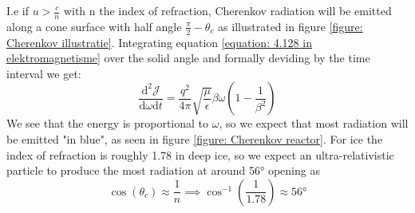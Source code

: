 \documentclass[11pt,a4paper,faculty=we,language=en,doctype=report]{cls/ugent-doc}
\begin{document}
I.e if $u>\frac{c}{n}$ with n the index of refraction, Cherenkov radiation will be emitted along a cone surface with half angle $\frac{\pi}{2}-\theta_c$ as illustrated in figure \ref{figure: Cherenkov illustratie}. Integrating equation \ref{equation: 4.128 in elektromagnetisme} over the solid angle and formally deviding by the time interval we get:
\begin{equation}
	\frac{\text{d}^2\mathscr{J}}{\text{d}\omega \text{d}t} = \frac{q^2}{4\pi}\sqrt{\frac{\mu}{\epsilon}}\beta\omega\left(1-\frac{1}{\beta^2}\right)	
\end{equation}
We see that the energy is proportional to $\omega$, so we expect that most
radiation will be emitted "in blue", as seen in figure \ref{figure: Cherenkov
reactor}.  For ice the index of refraction is roughly 1.78 in deep ice, so we
expect an ultra-relativistic particle to produce the most radiation at around
56° opening as 
\begin{equation}
	\cos(\theta_c) \approx \frac{1}{n} \implies \cos^{-1}\left(\frac{1}{1.78}\right)\approx 56\text{°}
\end{equation}
\end{document}
